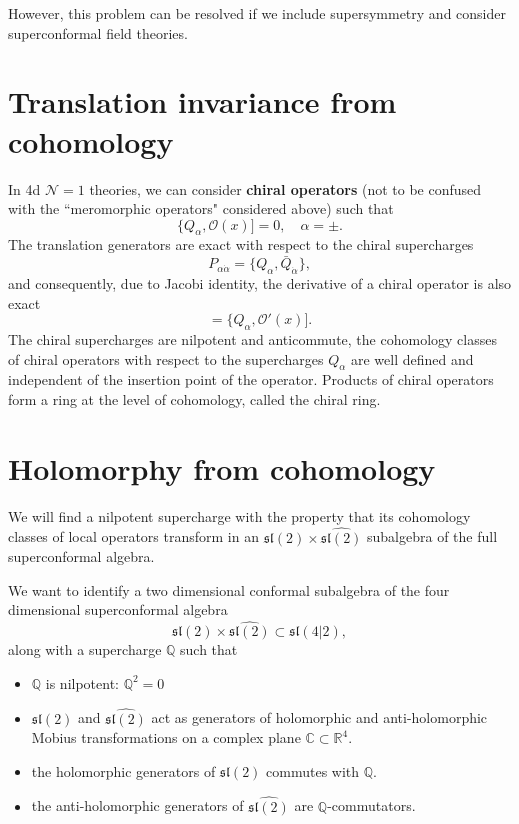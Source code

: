 \documentclass[a4paper,11pt]{article}
\begin{document}
However, this problem can be resolved if we include supersymmetry and consider superconformal field theories.

\section{Translation invariance from cohomology}
In 4d $\mathcal{N}=1$ theories, we can consider \textbf{chiral operators} (not to be confused with the ``meromorphic operators" considered above) such that
\begin{equation}
    \{Q_\alpha, \mathcal{O}(x)] = 0, \quad \alpha = \pm.
\end{equation}
The translation generators are exact with respect to the chiral supercharges
\begin{equation}
    P_{\alpha \dot{\alpha}} = \{Q_\alpha, \bar{Q}_{\dot{\alpha}}\},
\end{equation}
and consequently, due to Jacobi identity, the derivative of a chiral operator is also exact
\begin{equation}
    [P_{\alpha \dot{\alpha}}, \mathcal{O}(x)] = \{Q_\alpha,\mathcal{O}'(x)].
\end{equation}
The chiral supercharges are nilpotent and anticommute, the cohomology classes of chiral operators with respect to the supercharges $Q_\alpha$ are well defined and independent of the insertion point of the operator. Products of chiral operators form a ring at the level of cohomology, called the chiral ring.

\section{Holomorphy from cohomology}
We will find a nilpotent supercharge with the property that its cohomology classes of local operators transform in an $\mathfrak{sl}(2) \times \widehat{\mathfrak{sl}(2)}$ subalgebra of the full superconformal algebra.

We want to identify a two dimensional conformal subalgebra of the four dimensional superconformal algebra
\begin{equation}
    \mathfrak{sl}(2) \times \widehat{\mathfrak{sl}(2)} \subset \mathfrak{sl}(4|2),
\end{equation}
along with a supercharge $\mathbb{Q}$ such that
\begin{itemize}
    \item $\mathbb{Q}$ is nilpotent: $\mathbb{Q}^2 = 0$
    \item $\mathfrak{sl}(2)$ and $\widehat{\mathfrak{sl}(2)}$ act as generators of holomorphic and anti-holomorphic Mobius transformations on a complex plane $\mathbb{C} \subset \mathbb{R}^4$.
    \item the holomorphic generators of $\mathfrak{sl}(2)$ commutes with $\mathbb{Q}$.
    \item the anti-holomorphic generators of $\widehat{\mathfrak{sl}(2)}$ are $\mathbb{Q}$-commutators.
\end{itemize}
\end{document}
